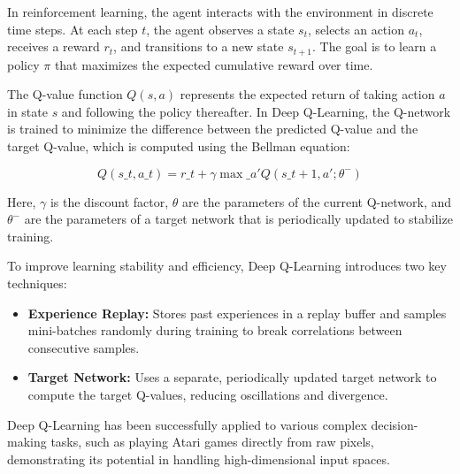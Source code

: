 \documentclass[16pt]{report}
\begin{document}
In reinforcement learning, the agent interacts with the environment in discrete time steps. At each step $t$, the agent observes a state $s_t$, selects an action $a_t$, receives a reward $r_t$, and transitions to a new state $s_{t+1}$. The goal is to learn a policy $\pi$ that maximizes the expected cumulative reward over time.

The Q-value function $Q(s, a)$ represents the expected return of taking action $a$ in state $s$ and following the policy thereafter. In Deep Q-Learning, the Q-network is trained to minimize the difference between the predicted Q-value and the target Q-value, which is computed using the Bellman equation:

\begin{equation}
Q(s\_t, a\_t) = r\_t + \gamma \max\_{a'} Q(s\_{t+1}, a'; \theta^-)
\end{equation}

Here, $\gamma$ is the discount factor, $\theta$ are the parameters of the current Q-network, and $\theta^-$ are the parameters of a target network that is periodically updated to stabilize training.

To improve learning stability and efficiency, Deep Q-Learning introduces two key techniques:
\begin{itemize}
\item \textbf{Experience Replay:} Stores past experiences in a replay buffer and samples mini-batches randomly during training to break correlations between consecutive samples.
\item \textbf{Target Network:} Uses a separate, periodically updated target network to compute the target Q-values, reducing oscillations and divergence.
\end{itemize}

Deep Q-Learning has been successfully applied to various complex decision-making tasks, such as playing Atari games directly from raw pixels, demonstrating its potential in handling high-dimensional input spaces.




\end{document}
